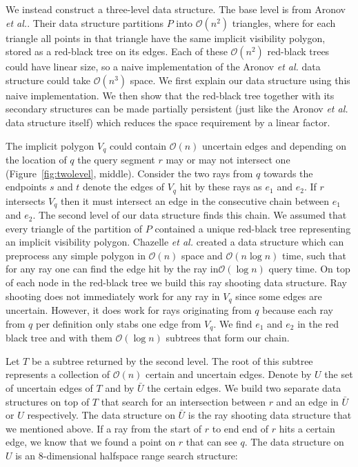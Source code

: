 \documentclass[a4paper, UKenglish]{lipics-v2018}
\newcommand{\etal}{\textit{et al.}\xspace}
\begin{document}
We instead construct a three-level data structure. The base level is from Aronov \etal. Their data structure partitions $P$ into $\mathcal{O}(n^2)$ triangles, where for each triangle all points in that triangle have the same implicit visibility polygon, stored as a red-black tree on its edges. Each of these $\mathcal{O}(n^2)$ red-black trees could have linear size, so a naive implementation of the Aronov \etal data structure could take $\mathcal{O}(n^3)$ space. We first explain our data structure using this naive implementation. We then show that the red-black tree together with its secondary structures can be made partially persistent (just like the Aronov \etal data structure itself) which reduces the space requirement by a linear factor.

The implicit polygon $V_q$ could contain $\mathcal{O}(n)$ uncertain edges and depending on the location of $q$ the query segment $r$ may or may not intersect one (Figure~\ref{fig:twolevel}, middle). Consider the two rays from $q$ towards the endpoints $s$ and $t$ denote the edges of $V_q$ hit by these rays as $e_1$ and $e_2$. If $r$ intersects $V_q$ then it must intersect an edge in the consecutive chain between $e_1$ and $e_2$. The second level of our data structure finds this chain. We assumed that every triangle of the partition of $P$ contained a unique red-black tree representing an implicit visibility polygon. Chazelle \etal \cite{chazelle1994ray}  created a data structure which can preprocess any simple polygon in $\mathcal{O}(n)$ space and $\mathcal{O}(n \log n)$ time, such that for any ray one can find the edge hit by the ray in$\mathcal{O}(\log n)$ query time. On top of each node in the red-black tree we build this ray shooting data structure. Ray shooting does not immediately work for any ray in $V_q$ since some edges are uncertain. However, it does work for rays originating from $q$ because each ray from $q$ per definition only stabs one edge from $V_q$.  We find $e_1$ and $e_2$ in the red black tree and with them $\mathcal{O}(\log n)$ subtrees that form our chain.

Let $T$ be a subtree returned by the second level. The root of this subtree represents a collection of $\mathcal{O}(n)$ certain and uncertain edges. Denote by $U$ the set of uncertain edges of $T$ and by $\bar{U}$ the certain edges. We build two separate data structures on top of $T$ that search for an intersection between $r$ and an edge in $\bar{U}$ or $U$ respectively. The data structure on $\bar{U}$ is the ray shooting data structure that we mentioned above. If a ray from the start of $r$ to end end of $r$ hits a certain edge, we know that we found a point on $r$ that can see $q$. The data structure on $U$ is an $8$-dimensional halfspace range search structure: 
\end{document}
